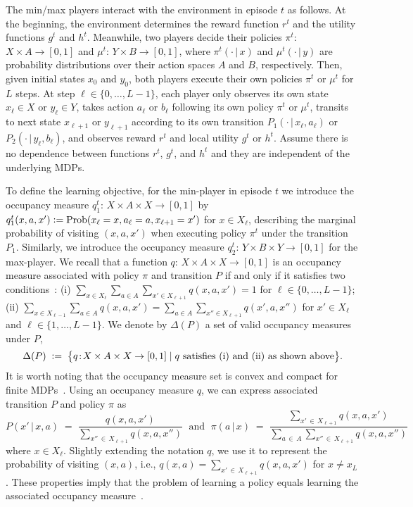 \documentclass[12pt, final]{l4dc2023}
\begin{document}
The min/max players interact with the environment in episode $t$ as follows. At the beginning, the environment determines the reward function $r^t$ and the utility functions $g^t$ and $h^t$. Meanwhile, two players decide their policies $\pi^t$: $X\times A \to [0,1]$ and $\mu^t$: $Y\times B\to [0,1]$, where $\pi^t( \cdot\,\vert\,x)$ and $\mu^t( \cdot\,\vert\,y)$ are probability distributions over their action spaces $A$ and $B$, respectively. Then, given initial states $x_0$ and $y_0$, both players execute their own policies $\pi^t$ or $\mu^t$ for $L$ steps. At step $\ell\in \{0,\ldots,L-1 \}$, each player only observes its own state $x_{\ell}\in X$ or $y_\ell\in Y$, takes action $a_\ell$ or $b_\ell$ following its own policy $\pi^t$ or $\mu^t$, transits to next state $x_{\ell+1}$ or $y_{\ell+1}$ according to its own transition $P_1(\cdot\,\vert\,x_\ell,a_\ell)$ or $P_2(\cdot\,\vert\,y_\ell,b_\ell)$, and observes reward $r^t$ and local utility $g^t$ or $h^t$. Assume there is no dependence between functions $r^t$, $g^t$, and $h^t$ and they are independent of the underlying MDPs.

To define the learning objective, for the min-player in episode $t$ we introduce the occupancy measure $q_1^t$: $X\times A\times X\to [0,1]$ by $q_1^t(x,a,x') \mathrel{\mathop:}= \text{Prob} (x_\ell=x, a_\ell = a, x_{\ell+1} = x')$ for $x\in X_\ell$, describing the marginal probability of visiting $(x,a,x')$ when executing policy $\pi^t$ under the transition $P_1$. Similarly, we introduce the occupancy measure $q_2^t$: $Y\times B\times Y\to [0,1]$ for the max-player. We recall that a function $q$: $X\times A\times X\to [0,1]$ is an occupancy measure associated with policy $\pi$ and transition $P$ if and only if it satisfies two conditions~\citep{altman1999constrained}: (i) $\sum_{x\in X_\ell}\sum_{a\in A}\sum_{x'\in X_{\ell+1}} q(x, a, x') = 1$ for $\ell \in\{0,\ldots,L-1\}$; (ii) $\sum_{x\in X_{\ell-1}}\sum_{a\in A} q(x, a, x') =\sum_{a\in A}\sum_{x''\in X_{\ell+1}} q(x', a, x'')$ for $x'\in X_\ell$ and $\ell \in\{1,\ldots,L-1\}$. We denote by $\Delta(P)$ a set of valid occupancy measures under $P$,
\[
\Delta(P) \;\mathrel{\mathop:}=\; \big\{ q\!:\! X\times A\times X\to [0,1] \;\vert\; q\text{ satisfies (i) and (ii) as shown above}\big\}.
\]
It is worth noting that the occupancy measure set is convex and compact for finite MDPs~\citep{altman1999constrained}.
Using an occupancy measure $q$, we can express associated transition $P$ and policy $\pi$ as
\begin{equation}\label{eq.P_pi}
P(x'\,\vert\,x,a) \;=\;\frac{q(x,a,x')}{\sum_{x''\,\in\,X_{\ell+1}}q(x,a,x'') }
\; \text{ and } \;
\pi(a\,\vert\,x) \;=\; \frac{\sum_{x'\,\in\,X_{\ell+1}} q(x,a,x')}{\sum_{a\,\in\,A}\sum_{x''\,\in\,X_{\ell+1}}q(x,a,x'') }
\end{equation}
where $x\in X_\ell$. Slightly extending the notation $q$, we use it to represent the probability of visiting $(x,a)$, i.e., $q(x, a) = \sum_{x'\,\in\,X_{\ell+1}} q(x,a,x')$ for $x\neq x_L$. These properties imply that the problem of learning a policy equals learning the associated occupancy measure~\citep{zimin2013online}.
\end{document}
